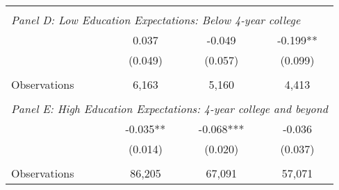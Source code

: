 {\begin{tabular}{lccc}
&  &  &   \\
\multicolumn{4}{l}{\textit{Panel D: Low Education Expectations: Below 4-year college}} \\
\hspace{3mm}        &       0.037   &      -0.049   &      -0.199** \\
                    &     (0.049)   &     (0.057)   &     (0.099)   \\
                    &               &               &               \\
\hspace{3mm}Observations&       6,163   &       5,160   &       4,413   \\
 
&  &  &   \\
\multicolumn{4}{l}{\textit{Panel E: High Education Expectations: 4-year college and beyond}} \\
\hspace{3mm}        &      -0.035** &      -0.068***&      -0.036   \\
                    &     (0.014)   &     (0.020)   &     (0.037)   \\
                    &               &               &               \\
\hspace{3mm}Observations&      86,205   &      67,091   &      57,071   \\
 

\bottomrule
\end{tabular}
}
